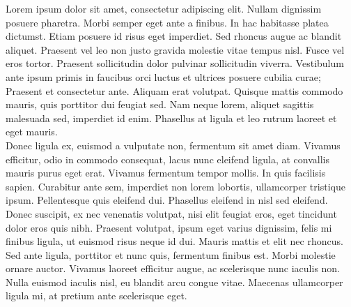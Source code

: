 \noindent Lorem ipsum dolor sit amet, consectetur adipiscing elit. Nullam dignissim posuere pharetra. Morbi semper eget ante a finibus. In hac habitasse platea dictumst. Etiam posuere id risus eget imperdiet. Sed rhoncus augue ac blandit aliquet. Praesent vel leo non justo gravida molestie vitae tempus nisl. Fusce vel eros tortor. Praesent sollicitudin dolor pulvinar sollicitudin viverra. Vestibulum ante ipsum primis in faucibus orci luctus et ultrices posuere cubilia curae; Praesent et consectetur ante. Aliquam erat volutpat. Quisque mattis commodo mauris, quis porttitor dui feugiat sed. Nam neque lorem, aliquet sagittis malesuada sed, imperdiet id enim. Phasellus at ligula et leo rutrum laoreet et eget mauris. \\

Donec ligula ex, euismod a vulputate non, fermentum sit amet diam. Vivamus efficitur, odio in commodo consequat, lacus nunc eleifend ligula, at convallis mauris purus eget erat. Vivamus fermentum tempor mollis. In quis facilisis sapien. Curabitur ante sem, imperdiet non lorem lobortis, ullamcorper tristique ipsum. Pellentesque quis eleifend dui. Phasellus eleifend in nisl sed eleifend. \\

Donec suscipit, ex nec venenatis volutpat, nisi elit feugiat eros, eget tincidunt dolor eros quis nibh. Praesent volutpat, ipsum eget varius dignissim, felis mi finibus ligula, ut euismod risus neque id dui. Mauris mattis et elit nec rhoncus. Sed ante ligula, porttitor et nunc quis, fermentum finibus est. Morbi molestie ornare auctor. Vivamus laoreet efficitur augue, ac scelerisque nunc iaculis non. Nulla euismod iaculis nisl, eu blandit arcu congue vitae. Maecenas ullamcorper ligula mi, at pretium ante scelerisque eget.